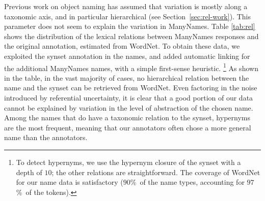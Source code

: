 Previous work on object naming has assumed that variation is mostly along a taxonomic axis, and in particular hierarchical (see Section~\ref{sec:rel-work}).
This parameter does not seem to explain the variation in ManyNames. 
Table \ref{tab:rel} shows the distribution of the lexical relations between ManyNames responses and the original \vg annotation, estimated from WordNet.
To obtain these data, we exploited the synset annotation in the \vg names, and added automatic linking for the additional ManyNames names, with a simple first-sense heuristic.%
\footnote{To detect hypernyms, we use the hypernym closure of the synset with a depth of $10$; the other relations are straightforward. The coverage of WordNet for our name data is satisfactory ($90$\%\ of the name types, accounting for $97$\%\ of the tokens).}
As shown in the table, in the vast majority of cases, no hierarchical relation between the name and the synset can be retrieved from WordNet.
Even factoring in the noise introduced by referential uncertainty, it is clear that a good portion of our data cannot be explained by variation in the level of abstraction of the chosen name. 
Among the names that do have a taxonomic relation to the synset, hypernyms are the most frequent, meaning that our annotators often chose a more general name than the \vg annotators.
%

